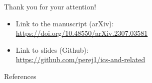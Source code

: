 \documentclass[11pt, aspectratio=169]{beamer}
\begin{document}

\begin{frame}
  Thank you for your attention!
  \begin{itemize}
    \item Link to the manuscript (arXiv): \\
    \url{https://doi.org/10.48550/arXiv.2307.03581}
    \item Link to slides (Github): \\
    \url{https://github.com/perej1/ics-and-related}
  \end{itemize}
\end{frame}


\begin{frame}[allowframebreaks]{References}
  \printbibliography
\end{frame}
\end{document}
